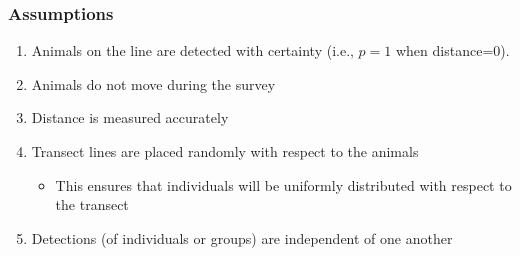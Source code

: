 \documentclass[color=usenames,dvipsnames]{beamer}\usepackage[]{graphicx}\usepackage[]{color}
\begin{document}












\begin{frame}
  \frametitle{Assumptions}
  \large
  \begin{enumerate}[<+- | visible@+->][(1)]%
    \item Animals on the line are detected with certainty (i.e., $p=1$ when distance=0).
    \item Animals do not move during the survey
    \item Distance is measured accurately
    \item Transect lines are placed randomly with respect to the animals
      \begin{itemize}
        \large
        \item This ensures that individuals will be uniformly
          distributed with respect to the transect
      \end{itemize}
    \item Detections (of individuals or groups) are independent of one another
  \end{enumerate}
\end{frame}
\end{document}
